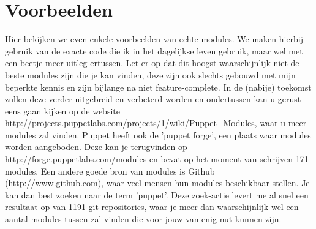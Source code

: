 \section{Voorbeelden}
Hier bekijken we even enkele voorbeelden van echte modules. We maken hierbij gebruik van de exacte code die ik in het dagelijkse leven gebruik, maar wel met een beetje meer uitleg ertussen. Let er op dat dit hoogst waarschijnlijk niet de beste modules zijn die je kan vinden, deze zijn ook slechts gebouwd met mijn beperkte kennis en zijn bijlange na niet feature-complete. In de (nabije) toekomst zullen deze verder uitgebreid en verbeterd worden en ondertussen kan u gerust eens gaan kijken op de website\\
http://projects.puppetlabs.com/projects/1/wiki/Puppet\_Modules, waar u meer modules zal vinden. Puppet heeft ook de 'puppet forge', een plaats waar modules worden aangeboden. Deze kan je terugvinden op\\
http://forge.puppetlabs.com/modules en bevat op het moment van schrijven 171 modules. Een andere goede bron van modules is Github (http://www.github.com), waar veel mensen hun modules beschikbaar stellen. Je kan dan best zoeken naar de term 'puppet'. Deze zoek-actie levert me al snel een resultaat op van 1191 git repositories, waar je meer dan waarschijnlijk wel een aantal modules tussen zal vinden die voor jouw van enig nut kunnen zijn.
%



